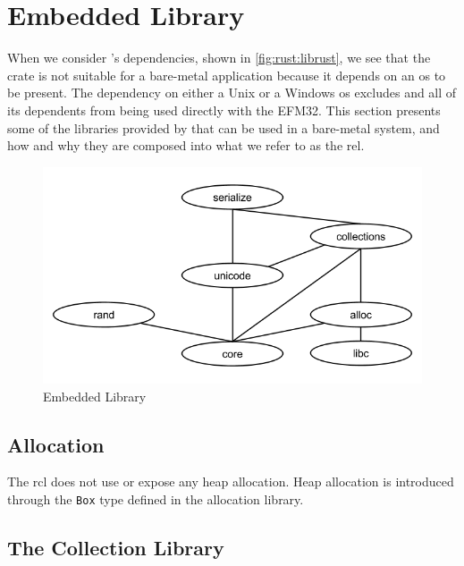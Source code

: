 \section{\rust Embedded Library}
\label{sec:rust_embedded_library}

When we consider \std's dependencies, shown in \autoref{fig:rust:librust}, we see that the crate is not suitable for a bare-metal application because it depends on an \gls{os} to be present.
The dependency on either a Unix or a Windows \gls{os} excludes \std and all of its dependents from being used directly with the EFM32.
This section presents some of the libraries provided by \rust that can be used in a bare-metal system, and how and why they are composed into what we refer to as the \gls{rel}.

\begin{figure}[H]
  \begin{center}
    \includegraphics[scale=0.3]{figures/background/rust/embedded-rust-lib.png}
  \end{center}
  \caption{\rust Embedded Library}
  \label{fig:rust:rel}
\end{figure}

\subsection{Allocation}
\label{sec:rust:allocation}

The \gls{rcl} does not use or expose any heap allocation.
Heap allocation is introduced through the \texttt{Box} type defined in the allocation library.

\subsection{The Collection Library}

